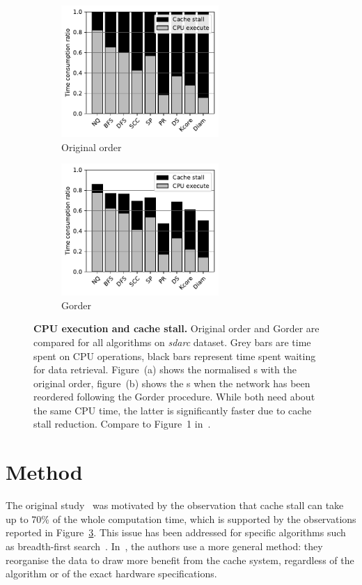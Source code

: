\begin{figure}%
\begin{subfigure}{0.49\textwidth}
\includegraphics[width=\linewidth, height=5cm]{img/img-cache-original.pdf} 
\caption{Original order}
\label{img-cache-original}
\end{subfigure}
\begin{subfigure}{0.49\textwidth}
\includegraphics[width=\linewidth, height=5cm]{img/img-cache-gorder.pdf}
\caption{Gorder}
\label{img-cache-gorder}
\end{subfigure}
\caption{\textbf{CPU execution and cache stall.} Original order and Gorder are compared for all algorithms on \textit{sdarc} dataset. Grey bars are time spent on CPU operations, black bars represent time spent waiting for data retrieval. Figure~(a) shows the normalised \runtime s with the original order, figure~(b) shows the \runtime s when the network has been reordered following the Gorder procedure. While both need about the same CPU time, the latter is significantly faster due to cache stall reduction. Compare to Figure~1 in~\cite{gorder}.}
\label{img-cache}
\end{figure}


\section{Method} \label{method}

The original study~\cite{gorder} was motivated by the observation that cache stall can take up to 70\% of the whole computation time, which is supported by the observations reported in Figure~\ref{img-cache}.
%
 This issue has been addressed for specific algorithms such as breadth-first search~\cite{bfs-cache}.
 In~\cite{gorder}, the authors use a more general method: they reorganise the data to draw more benefit from the cache system, regardless of the algorithm or of the exact hardware specifications.
 

